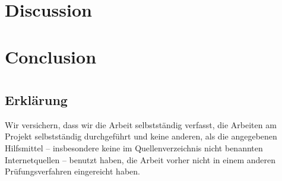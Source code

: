 \documentclass[
	12pt,
	a4paper,
	BCOR10mm,
	DIV14,
	listof=totoc,
	bibliography=totoc,
	headsepline
]{scrreprt}
\begin{document}
	
\chapter{Discussion}
\label{Discussion}


\chapter{Conclusion}
\label{Conclusion}

\nocite{*}



\listoffigures

\listoftables

\lstlistoflistings

\newpage

\thispagestyle{empty}

\chapter*{}

\section*{Erklärung}

Wir versichern, dass wir die Arbeit selbstständig verfasst, die Arbeiten am Projekt selbstständig durchgeführt und keine anderen, als die angegebenen Hilfsmittel -- insbesondere keine im Quellenverzeichnis nicht benannten Internetquellen -- benutzt haben, die Arbeit vorher nicht in einem anderen Prüfungsverfahren eingereicht haben.

\smallskip


\bigskip
\bigskip
\bigskip
\end{document}
